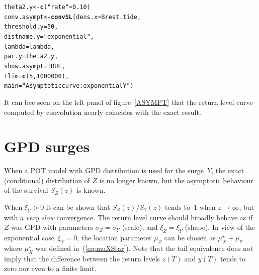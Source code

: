 \documentclass[11pt,a4paper]{report}\usepackage[]{graphicx}\usepackage[]{color}
\makeatletter
\newcommand{\hlnum}[1]{\textcolor[rgb]{0.686,0.059,0.569}{#1}}%
\newcommand{\hlstr}[1]{\textcolor[rgb]{0.192,0.494,0.8}{#1}}%
\newcommand{\hlstd}[1]{\textcolor[rgb]{0.345,0.345,0.345}{#1}}%
\newcommand{\hlkwb}[1]{\textcolor[rgb]{0.69,0.353,0.396}{#1}}%
\newcommand{\hlkwc}[1]{\textcolor[rgb]{0.333,0.667,0.333}{#1}}%
\newcommand{\hlkwd}[1]{\textcolor[rgb]{0.737,0.353,0.396}{\textbf{#1}}}%
\newenvironment{kframe}{%
 \def\at@end@of@kframe{}%
 \ifinner\ifhmode%
  \def\at@end@of@kframe{\end{minipage}}%
  \begin{minipage}{\columnwidth}%
 \fi\fi%
 \def\FrameCommand##1{\hskip\@totalleftmargin \hskip-\fboxsep
 \colorbox{shadecolor}{##1}\hskip-\fboxsep
     \hskip-\linewidth \hskip-\@totalleftmargin \hskip\columnwidth}%
 \MakeFramed {\advance\hsize-\width
   \@totalleftmargin\z@ \linewidth\hsize
   \@setminipage}}%
 {\par\unskip\endMakeFramed%
 \at@end@of@kframe}
\newenvironment{knitrout}{}{} %
\makeatother
\begin{document}
\begin{knitrout}
\color{fgcolor}\begin{kframe}
\begin{alltt}
\hlstd{theta2.y} \hlkwb{<-} \hlkwd{c}\hlstd{(}\hlstr{"rate"} \hlstd{=} \hlnum{0.10}\hlstd{)}
\hlstd{conv.asympt} \hlkwb{<-} \hlkwd{convSL}\hlstd{(}\hlkwc{dens.x} \hlstd{= Brest.tide,}
                      \hlkwc{threshold.y} \hlstd{=} \hlnum{50}\hlstd{,}
                      \hlkwc{distname.y} \hlstd{=} \hlstr{"exponential"}\hlstd{,}
                      \hlkwc{lambda} \hlstd{= lambda,}
                      \hlkwc{par.y} \hlstd{= theta2.y,}
                      \hlkwc{show.asympt} \hlstd{=} \hlnum{TRUE}\hlstd{,}
                      \hlkwc{Tlim} \hlstd{=} \hlkwd{c}\hlstd{(}\hlnum{5}\hlstd{,} \hlnum{1000000}\hlstd{),}
                      \hlkwc{main} \hlstd{=} \hlstr{"Asymptotic curve: exponential Y"}\hlstd{)}
\end{alltt}
\end{kframe}
\end{knitrout}
It can bee seen on the left panel of figure~\ref{ASYMPT}
that the return level curve computed by convolution nearly 
coincides with the exact result.

\section{GPD surges}
\label{GPDSurgesANN}
When a POT model with GPD distribution is used for the surge~$Y$,
the exact (conditional) distribution of $Z$ is no longer known,
but the asymptotic behaviour of the survival $S_Z(z)$ is known.

When $\xi_Y>0$ it can be shown that $S_Z(z)/S_Y(z)$ tends to~$1$ when $z \to
\infty$, but with a \textit{very slow} convergence. The return level curve
should broadly behave as if $Z$ was GPD with parameters $\sigma_Z = \sigma_Y$
(scale), and $\xi_Z = \xi_Y$ (shape). In view of the exponential case~$\xi_Y=0$,
the location parameter $\mu_Z$ can be chosen as $\mu^\star_X + \mu_Y$ where
$\mu_X^\star$ was defined in~(\ref{eq:muXStar}). Note that the tail 
equivalence does not imply that the difference between the return levels
$z(T)$ and $y(T)$ tends to zero nor even to a finite limit.
\end{document}
